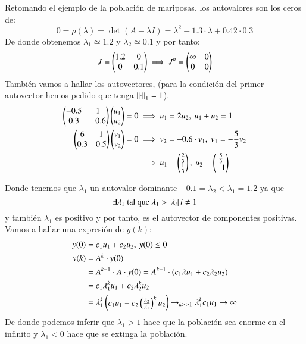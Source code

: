\begin{eg}

    Retomando el ejemplo de la población de mariposas, los autovalores son los ceros de:
    $$
        0 = \rho(\lambda) = \det(A - \lambda I) = \lambda^2 - 1.3\cdot \lambda + 0.42\cdot 0.3
    $$
    De donde obtenemos $\lambda_1 \simeq 1.2$ y $\lambda_2 \simeq 0.1$ y por tanto:
    $$
        J = \px{1.2 & 0 \\ 0 & 0.1} \implies J^n = \px{\infty & 0 \\ 0 & 0}
    $$
    También vamos a hallar los autovectores, (para la condición del primer autovector hemos pedido que tenga $\left|\left|\cdot\right|\right|_1 = 1$).
    \begin{align*}
        \px{-0.5 & 1\\ 0.3 & -0.6}\px{u_1 \\ u_2} = 0 &\implies u_1 = 2u_2,\ u_1+u_2=1\\
        \px{6 & 1\\ 0.3 & 0.5}\px{v_1 \\ v_2} = 0 &\implies v_2 = -0.6 \cdot v_1,\ v_1 = -\frac{5}{3}v_2\\
        &\implies u_1 = \px{\frac{2}{3} \\ \frac{1}{3}},\ u_2 = \px{\frac{5}{3}\\ -1}
    \end{align*}

    Donde tenemos que $\lambda_1$ un autovalor dominante $-0.1 = \lambda_2 < \lambda_1 = 1.2$ ya que
    $$
        \exists \lambda_1 \text{ tal que } \lambda_1 > \left|\lambda_i\right| i\neq 1
    $$
    y también $\lambda_1$ es positivo y por tanto, es el autovector de componentes positivas.\\
    Vamos a hallar una expresión de $y(k)$:
    \begin{align*}
        y(0) &= c_1 u_1 + c_2 u_2,\ y(0) \leq 0\\
        y(k) &= A^k \cdot y(0)\\
             &= A^{k-1} \cdot A \cdot y(0) = A^{k-1} \cdot(c_1 \lambda u_1 + c_2 \lambda_2 u_2)\\
             &= c_1 \lambda_1^k u_1 + c_2 \lambda_2^k u_2\\
             &= \lambda_1^k \px{c_1 u_1 + c_2 \pfrac{\lambda_2}{\lambda_1}^ku_2} \to_{k>>1} \lambda_1^k c_1 u_1 \to \infty
    \end{align*}
    De donde podemos inferir que $\lambda_1 > 1$ hace que la población sea enorme en el infinito y $\lambda_1 < 0$ hace que se extinga la población.
\end{eg}

